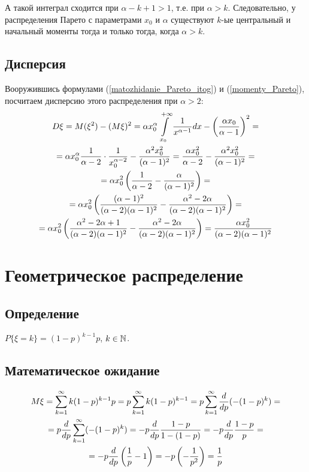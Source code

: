 А такой интеграл сходится при $\alpha-k+1 > 1$, т.е. при $\alpha > k$.
Следовательно, у распределения Парето с параметрами $x_0$ и $\alpha$ существуют $k$-ые центральный и начальный моменты тогда и только тогда, когда $\alpha > k$.

\subsection{Дисперсия}
Вооружившись формулами (\ref{matozhidanie_Pareto_itog}) и (\ref{momenty_Pareto}), посчитаем дисперсию этого распределения при $\alpha>2$:
\begin{multline}
D\xi=
M(\xi^2)-(M\xi)^2 =
\alpha x_0^\alpha \int\limits_{x_0}^{+\infty} \frac{1}{x^{\alpha-1}} dx - \left(\frac{\alpha x_0}{\alpha-1}\right)^2 =
\\=
\alpha x_0^\alpha \frac{1}{\alpha-2}\cdot\frac{1}{x_0^{\alpha-2}} - \frac{\alpha^2 x_0^2}{(\alpha-1)^2} = 
\frac{\alpha x_0^2}{\alpha-2} - \frac{\alpha^2 x_0^2}{(\alpha-1)^2} = 
\\=
\alpha x_0^2\left(\frac{1}{\alpha-2} - \frac{\alpha}{(\alpha-1)^2}\right) = 
\\=
\alpha x_0^2\left(\frac{(\alpha-1)^2}{(\alpha-2)(\alpha-1)^2} - \frac{\alpha^2-2\alpha}{(\alpha-2)(\alpha-1)^2}\right) =
\\= 
\alpha x_0^2\left(\frac{\alpha^2-2\alpha + 1}{(\alpha-2)(\alpha-1)^2} - \frac{\alpha^2-2\alpha}{(\alpha-2)(\alpha-1)^2}\right) = 
\frac{\alpha x_0^2}{(\alpha-2)(\alpha-1)^2}
\end{multline}

\section{Геометрическое распределение}
\subsection{Определение}
$P\{\xi=k\} = (1-p)^{k-1} p$, $k\in\mathbb{N}$.
\subsection{Математическое ожидание}
\begin{multline}\label{matozhidanie_geom}
M\xi =
\sum\limits_{k=1}^\infty k (1-p)^{k-1} p =
p\sum\limits_{k=1}^\infty k (1-p)^{k-1} =
p\sum\limits_{k=1}^\infty \frac{d}{dp}(-(1-p)^{k}) =
\\=
p\frac{d}{dp} \sum\limits_{k=1}^\infty (-(1-p)^{k}) =
-p\frac{d}{dp} \frac{1-p}{1-(1-p)} = 
-p\frac{d}{dp} \frac{1-p}{p} =
\\=
-p\frac{d}{dp} \left(\frac{1}{p}-1\right) = 
-p\left(-\frac{1}{p^2}\right) =
\frac{1}{p}
\end{multline}

